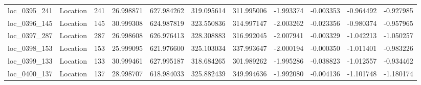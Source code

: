 \begin{tabular}{llrrrrrrrrr}
 loc_0395_241 &        Location &             241 &  26.998871 & 627.984262 &  319.095614 &    311.995006 &  -1.993374 &  -0.003353 &   -0.964492 &     -0.927985 \\
 loc_0396_145 &        Location &             145 &  30.999308 & 624.987819 &  323.550836 &    314.997147 &  -2.003262 &  -0.023356 &   -0.980374 &     -0.957965 \\
 loc_0397_287 &        Location &             287 &  26.998608 & 626.976413 &  328.308883 &    316.992045 &  -2.007941 &  -0.003329 &   -1.042213 &     -1.050257 \\
 loc_0398_153 &        Location &             153 &  25.999095 & 621.976600 &  325.103034 &    337.993647 &  -2.000194 &  -0.000350 &   -1.011401 &     -0.983226 \\
 loc_0399_133 &        Location &             133 &  30.999461 & 627.995187 &  318.684265 &    301.989262 &  -1.995286 &  -0.038823 &   -1.012557 &     -0.934462 \\
 loc_0400_137 &        Location &             137 &  28.998707 & 618.984033 &  325.882439 &    349.994636 &  -1.992080 &  -0.004136 &   -1.101748 &     -1.180174 \\
\bottomrule
\end{tabular}

